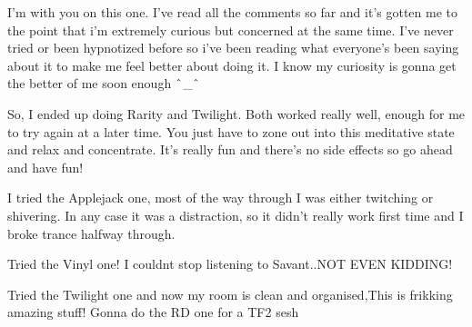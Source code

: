 \documentclass[ebook,12pt,oneside,openany]{memoir}
\newcommand{\carat}{$\char`\^$}
\newcommand{\mytexttilde}{\raisebox{0.5ex}{\texttildelow}}
\begin{document}
\begin{tcolorbox}[title=TheFlowerPoison]
\begin{tcolorbox}[title=BeauDozer]
\par{I'm with you on this one. I've read all the comments so far and it's gotten me to the point that i'm extremely curious but concerned at the same time. I've never tried or been hypnotized before so i've been reading what everyone's been saying about it to make me feel better about doing it. I know my curiosity is gonna get the better of me soon enough  \carat{}\_\carat{}}
\end{tcolorbox}
\par{So, I ended up doing Rarity and Twilight. Both worked really well, enough for me to try again at a later time. You just have to zone out into this meditative state and relax and concentrate. It's really fun and there's no side effects so go ahead and have fun!}
\end{tcolorbox}
\begin{tcolorbox}[title=\mytexttilde{}Chaotic Eddie\mytexttilde{}]
\par{I tried the Applejack one, most of the way through I was either twitching or shivering. In any case it was a distraction, so it didn't really work first time and I broke trance halfway through.}
\end{tcolorbox}
\begin{tcolorbox}[title=SapphireSmirk]
\par{Tried the Vinyl one! I couldnt stop listening to Savant..NOT EVEN KIDDING!}
\newline{}
\par{Tried the Twilight one and now my room is clean and organised,This is frikking amazing stuff! Gonna do the RD one for a TF2 sesh}
\end{tcolorbox}
\end{document}
